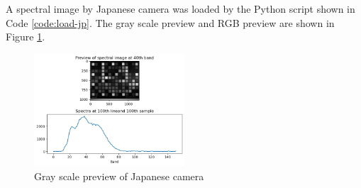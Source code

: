 A spectral image by Japanese camera was loaded by the Python script shown in Code \ref{code:load-jp}. The gray scale preview and RGB preview are shown in Figure \ref{fig:japanese-preview}.

\begin{figure}[H]
  \centering
  \caption{Gray scale preview of Japanese camera}
  \label{fig:japanese-preview}
  \includegraphics[width=0.5\textwidth]{./fig-task2/jp.png}
\end{figure}
